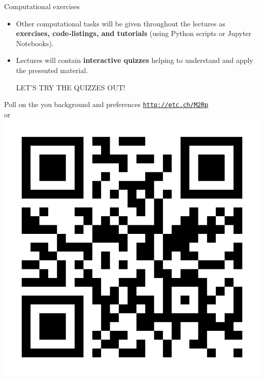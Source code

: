 \begin{frame}{Computational exercises}
\begin{itemize}
\begin{itemize}
\end{itemize}
\pause
\item Other computational tasks will be given throughout the lectures as \alert{\textbf{exercises, code-listings, and tutorials}} (using Python scripts or Jupyter Notebooks).
%
\pause
\item Lectures will contain \alert{\textbf{interactive quizzes}} helping to understand and apply the presented material. 
%
\begin{center}
    LET'S TRY THE QUIZZES OUT!
\end{center}
\end{itemize}
\end{frame}



\begin{frame}{Poll on the you background and preferences}
\centering 
\vskip 10pt
{\Large \href{http://etc.ch/M2Rp}{\textcolor{indigo(dye)}{\tt http://etc.ch/M2Rp}}}\\ 
or \\[10pt]
\includegraphics[height=0.4\columnwidth]{figures/intro/poll.png}
\end{frame}


